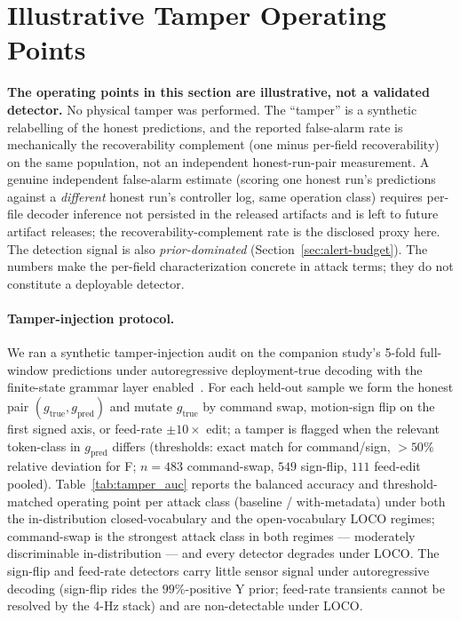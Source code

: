 \documentclass[sensors,article,submit,moreauthors,pdftex]{Definitions/mdpi}
\begin{document}
\section{Illustrative Tamper Operating Points}
\label{sec:operating-points}

\noindent\textbf{The operating points in this section are illustrative, not a validated detector.} No physical tamper was performed. The ``tamper'' is a synthetic relabelling of the honest predictions, and the reported false-alarm rate is mechanically the recoverability complement (one minus per-field recoverability) on the same population, not an independent honest-run-pair measurement. A genuine independent false-alarm estimate (scoring one honest run's predictions against a \emph{different} honest run's controller log, same operation class) requires per-file decoder inference not persisted in the released artifacts and is left to future artifact releases; the recoverability-complement rate is the disclosed proxy here. The detection signal is also \emph{prior-dominated} (Section~\ref{sec:alert-budget}). The numbers make the per-field characterization concrete in attack terms; they do not constitute a deployable detector.

\paragraph{Tamper-injection protocol.} We ran a synthetic tamper-injection audit on the companion study's 5-fold full-window predictions under autoregressive deployment-true decoding with the finite-state grammar layer enabled~\cite{decoder_paper}. For each held-out sample we form the honest pair $(g_{\text{true}}, g_{\text{pred}})$ and mutate $g_{\text{true}}$ by command swap, motion-sign flip on the first signed axis, or feed-rate $\pm 10\times$ edit; a tamper is flagged when the relevant token-class in $g_{\text{pred}}$ differs (thresholds: exact match for command/sign, $>50\%$ relative deviation for F; $n\!=\!483$ command-swap, $549$ sign-flip, $111$ feed-edit pooled). Table~\ref{tab:tamper_auc} reports the balanced accuracy and threshold-matched operating point per attack class (baseline / with-metadata) under both the in-distribution closed-vocabulary and the open-vocabulary LOCO regimes; command-swap is the strongest attack class in both regimes --- moderately discriminable in-distribution --- and every detector degrades under LOCO. The sign-flip and feed-rate detectors carry little sensor signal under autoregressive decoding (sign-flip rides the $99\%$-positive Y prior; feed-rate transients cannot be resolved by the 4-Hz stack) and are non-detectable under LOCO.
\end{document}
